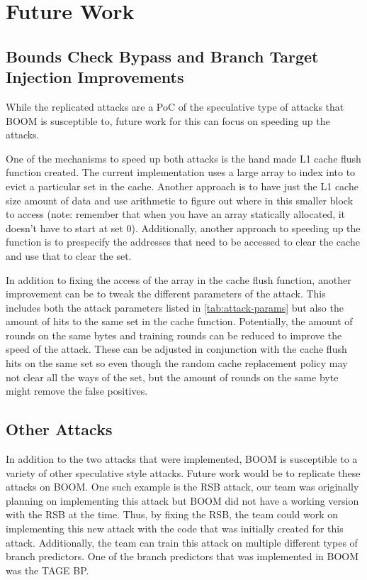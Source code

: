 \section{Future Work}

\subsection{Bounds Check Bypass and Branch Target Injection Improvements}

While the replicated attacks are a PoC of the speculative type of attacks that BOOM
is susceptible to, future work for this can focus on speeding up the attacks. 

One of the mechanisms to speed up both attacks is the hand made L1 cache flush function
created. The current implementation uses a large array to index into to evict a particular
set in the cache. Another approach is to have just the L1 cache size amount of data and use 
arithmetic to figure out where in this smaller block to access (note: remember that when
you have an array statically allocated, it doesn't have to start at set 0). Additionally,
another approach to speeding up the function is to prespecify the addresses that need to be
accessed to clear the cache and use that to clear the set. 

In addition to fixing the access of the array in the cache flush function, another
improvement can be to tweak the different parameters of the attack. This includes
both the attack parameters listed in \ref{tab:attack-params} but also the amount of
hits to the same set in the cache function. Potentially, the amount of rounds on the
same bytes and training rounds can be reduced to improve the speed of the attack.
These can be adjusted in conjunction with the cache flush hits on the same set so even though the 
random cache replacement policy may not clear all the ways of the set, but the amount of rounds on
the same byte might remove the false positives.

\subsection{Other Attacks}

In addition to the two attacks that were implemented, BOOM is susceptible to a variety of
other speculative style attacks. Future work would be to replicate these attacks on BOOM.
One such example is the RSB attack, our team was originally planning on implementing this
attack but BOOM did not have a working version with the RSB at the time. Thus, by fixing 
the RSB, the team could work on implementing this new attack with the code that was initially
created for this attack. Additionally, the team can train this attack on multiple different
types of branch predictors. One of the branch predictors that was implemented in BOOM was
the TAGE BP. 


